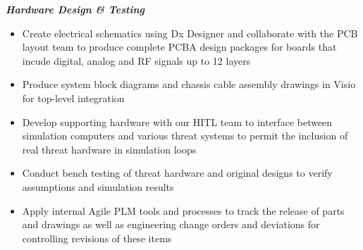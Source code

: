 \documentclass[]{article}
\begin{document}
\begin{singlespace}
\noindent\textbf{\emph{Hardware Design \& Testing}}    
\begin{itemize}
    \setlength\itemsep{0em}
    \item Create electrical schematics using Dx Designer and collaborate with the PCB layout team to produce 
    complete PCBA design packages for boards that incude digital, analog and RF signals up to 12 layers
    \item Produce system block diagrams and chassis cable assembly drawings in Visio for top-level integration
    \item Develop supporting hardware with our HITL team to interface between simulation computers 
    and various threat systems to permit the inclusion of real threat hardware in simulation loops
    \item Conduct bench testing of threat hardware and original designs to verify assumptions and simulation results
    \item Apply internal Agile PLM tools and processes to track the release of parts and drawings 
    as well as engineering change orders and deviations for controlling revisions of these items
\end{itemize}


\end{singlespace}
\end{document}
